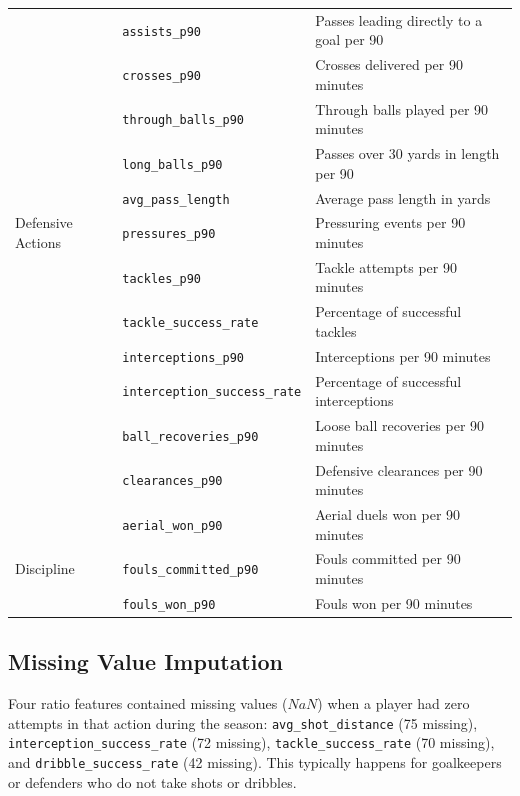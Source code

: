 \documentclass[12pt]{ai_conquer2026}
\begin{document}
\begin{table}[H]
\begin{minipage}{1.0\linewidth}
\begin{tabularx}{\linewidth}{@{}>{\raggedright\arraybackslash}p{3.5cm} >{\raggedright\arraybackslash}p{5.5cm} >{\raggedright\arraybackslash}X@{}}
     & \texttt{assists\_p90} & Passes leading directly to a goal per 90 \\
     & \texttt{crosses\_p90} & Crosses delivered per 90 minutes \\
     & \texttt{through\_balls\_p90} & Through balls played per 90 minutes \\
     & \texttt{long\_balls\_p90} & Passes over 30 yards in length per 90 \\
     & \texttt{avg\_pass\_length} & Average pass length in yards \\
    \midrule
    Defensive Actions & \texttt{pressures\_p90} & Pressuring events per 90 minutes \\
     & \texttt{tackles\_p90} & Tackle attempts per 90 minutes \\
     & \texttt{tackle\_\allowbreak success\_\allowbreak rate} & Percentage of successful tackles \\
     & \texttt{interceptions\_p90} & Interceptions per 90 minutes \\
     & \texttt{interception\_\allowbreak success\_\allowbreak rate} & Percentage of successful interceptions \\
     & \texttt{ball\_recoveries\_p90} & Loose ball recoveries per 90 minutes \\
     & \texttt{clearances\_p90} & Defensive clearances per 90 minutes \\
     & \texttt{aerial\_won\_p90} & Aerial duels won per 90 minutes \\
    \midrule
    Discipline & \texttt{fouls\_committed\_p90} & Fouls committed per 90 minutes \\
     & \texttt{fouls\_won\_p90} & Fouls won per 90 minutes \\
    \bottomrule
  \end{tabularx}
\end{minipage}
\end{table}

\subsection{Missing Value Imputation}
Four ratio features contained missing values ($NaN$) when a player had zero attempts in that action during the season: \texttt{avg\_shot\_distance} (75 missing), \texttt{interception\_success\_rate} (72 missing), \texttt{tackle\_success\_rate} (70 missing), and \texttt{dribble\_success\_rate} (42 missing). This typically happens for goalkeepers or defenders who do not take shots or dribbles.
\end{document}
